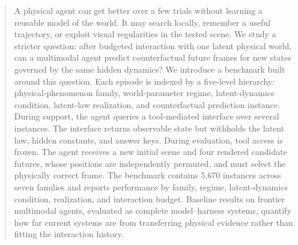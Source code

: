 \begin{abstract}
A physical agent can get better over a few trials without learning a reusable model of the world. It may search locally, remember a useful trajectory, or exploit visual regularities in the tested scene. We study a stricter question: after budgeted interaction with one latent physical world, can a multimodal agent predict counterfactual future frames for new states governed by the same hidden dynamics? We introduce a benchmark built around this question. Each episode is indexed by a five-level hierarchy: physical-phenomenon family, world-parameter regime, latent-dynamics condition, latent-law realization, and counterfactual prediction instance. During support, the agent queries a tool-mediated interface over several instances. The interface returns observable state but withholds the latent law, hidden constants, and answer keys. During evaluation, tool access is frozen. The agent receives a new initial scene and four rendered candidate futures, whose positions are independently permuted, and must select the physically correct frame. The benchmark contains 5,670 instances across seven families and reports performance by family, regime, latent-dynamics condition, realization, and interaction budget. Baseline results on frontier multimodal agents, evaluated as complete model--harness systems, quantify how far current systems are from transferring physical evidence rather than fitting the interaction history. 
\end{abstract}
